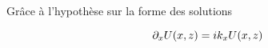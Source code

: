 % 
% 
% 








Grâce à l'hypothèse sur la forme des solutions

\[
\partial_{{x}} U({x},{z}) = ik_{x} U({x},{z})
\]


